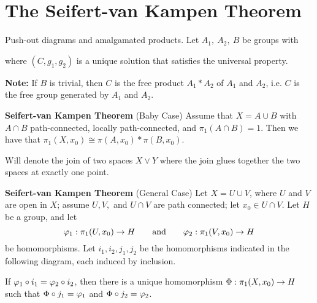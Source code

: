 \newpage
\setcounter{section}{11}
\section{The Seifert-van Kampen Theorem}
\vs


\dfn Push-out diagrams and amalgamated products. Let $A_1,\ A_2,\ B$ be groups with
\begin{center}
\end{center}
where $(C, g_1, g_2)$ is a unique solution that satisfies the universal property.

\textbf{Note:} If $B$ is trivial, then $C$ is the free product $A_1*A_2$ of $A_1$ and $A_2$, i.e. $C$ is the free group generated by $A_1$ and $A_2$.

\textbf{Seifert-van Kampen Theorem} (Baby Case) Assume that $X = A\cup B$ with $A\cap B$ path-connected, locally path-connected, and $\pi_1(A\cap B) = 1$. Then we have that $\pi_1(X, x_0) \cong \pi(A, x_0) * \pi(B, x_0)$.

\dfn Will denote the join of two spaces $X\vee Y$ where the join glues together the two spaces at exactly one point.

\textbf{Seifert-van Kampen Theorem} (General Case) Let $X = U\cup V$, where $U$ and $V$ are open in $X$; assume $U, V,$ and $U\cap V$ are path connected; let $x_0\in U\cap V$. Let $H$ be a group, and let 
\[\varphi_1:\pi_1(U, x_0)\rightarrow H\qquad\text{and}\qquad\varphi_2:\pi_1(V,x_0)\rightarrow H\]
be homomorphisms. Let $i_1,i_2,j_1,j_2$ be the homomorphisms indicated in the following diagram, each induced by inclusion.
\begin{center}
\end{center}
If $\varphi_1\circ i_1 = \varphi_2\circ i_2$, then there is a unique homomorphism $\Phi:\pi_1(X, x_0)\rightarrow H$ such that $\Phi\circ j_1 = \varphi_1$ and $\Phi\circ j_2 = \varphi_2$.





